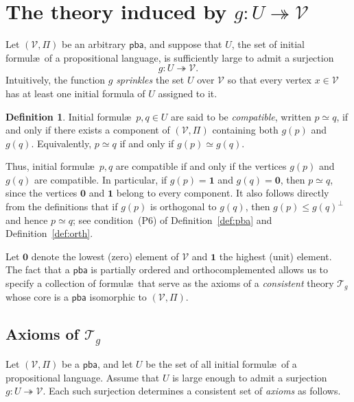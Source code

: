 \documentclass{article}   	%
\theoremstyle{plain}
\theoremstyle{definition}
\newtheorem{definition}[theorem]{Definition}
\theoremstyle{remark}
\newcommand{\pba}{\mathsf{pba}}
\begin{document}
\section{The theory induced by $g:U\twoheadrightarrow \mathcal V$}
\label{sec:gaxioms}

Let $(\mathcal V,\Pi)$ be an arbitrary $\pba$, and suppose that $U$, the set of initial formul\ae\ of a propositional language, is sufficiently large to admit a surjection
\[
g:U\twoheadrightarrow \mathcal V .
\]
Intuitively, the function $g$ \emph{sprinkles} the set $U$ over $\mathcal V$ so that every vertex
$x\in\mathcal V$ has at least one initial formula of $U$ assigned to it.

\begin{definition}
\label{def:compat-initial}
Initial formul\ae\ $p,q\in U$ are said to be \emph{compatible}, written $p\simeq q$, if and only if there exists a component of $(\mathcal V,\Pi)$ containing both $g(p)$ and $g(q)$.
Equivalently, $p\simeq q$ if and only if $g(p)\simeq g(q)$.
\end{definition}

Thus, initial formul\ae\ $p,q$ are compatible if and only if the vertices $g(p)$ and $g(q)$ are compatible.
In particular, if $g(p)=\mathbf 1$ and $g(q)=\mathbf 0$, then $p\simeq q$, since the vertices $\mathbf 0$ and $\mathbf 1$ belong to every component.
It also follows directly from the definitions that if $g(p)$ is orthogonal to $g(q)$, then $g(p)\le g(q)^\perp$ and hence $p\simeq q$;
see condition~\rm(P6) of Definition~\ref{def:pba} and Definition~\ref{def:orth}.

Let $\mathbf 0$ denote the lowest (zero) element of $\mathcal V$ and $\mathbf 1$ the highest (unit) element.
The fact that a $\pba$ is partially ordered and orthocomplemented allows us to specify a collection of formul\ae\ that serve as the axioms of a \emph{consistent} theory $\mathcal T_g$ whose core is a $\pba$ isomorphic to $(\mathcal V,\Pi)$.

\subsection{Axioms of $\mathcal T_g$}
\label{sec:mal2}%

Let $(\mathcal V,\Pi)$ be a $\pba$, and let $U$ be the set of all initial formul\ae\ of a propositional language.
Assume that $U$ is large enough to admit a surjection $g:U\twoheadrightarrow\mathcal V$.
Each such surjection determines a consistent set of \emph{axioms} as follows.
\end{document}
